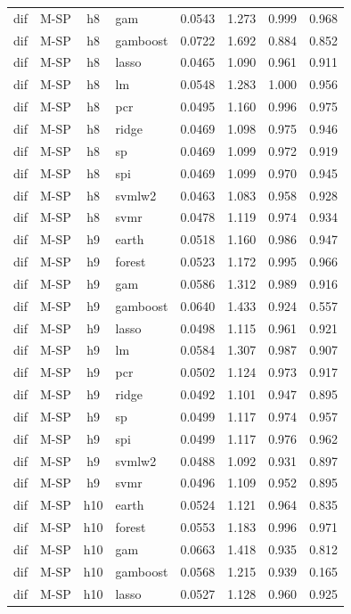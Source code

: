 \begin{ThreePartTable}
\begin{longtable}[t]{llclcccc}
dif & M-SP & h8 & gam & 0.0543 & 1.273 & 0.999 & 0.968\\
dif & M-SP & h8 & gamboost & 0.0722 & 1.692 & 0.884 & 0.852\\
dif & M-SP & h8 & lasso & 0.0465 & 1.090 & 0.961 & 0.911\\
dif & M-SP & h8 & lm & 0.0548 & 1.283 & 1.000 & 0.956\\
dif & M-SP & h8 & pcr & 0.0495 & 1.160 & 0.996 & 0.975\\
dif & M-SP & h8 & ridge & 0.0469 & 1.098 & 0.975 & 0.946\\
dif & M-SP & h8 & sp & 0.0469 & 1.099 & 0.972 & 0.919\\
dif & M-SP & h8 & spi & 0.0469 & 1.099 & 0.970 & 0.945\\
dif & M-SP & h8 & svmlw2 & 0.0463 & 1.083 & 0.958 & 0.928\\
dif & M-SP & h8 & svmr & 0.0478 & 1.119 & 0.974 & 0.934\\
\addlinespace
dif & M-SP & h9 & earth & 0.0518 & 1.160 & 0.986 & 0.947\\
dif & M-SP & h9 & forest & 0.0523 & 1.172 & 0.995 & 0.966\\
dif & M-SP & h9 & gam & 0.0586 & 1.312 & 0.989 & 0.916\\
dif & M-SP & h9 & gamboost & 0.0640 & 1.433 & 0.924 & 0.557\\
dif & M-SP & h9 & lasso & 0.0498 & 1.115 & 0.961 & 0.921\\
dif & M-SP & h9 & lm & 0.0584 & 1.307 & 0.987 & 0.907\\
dif & M-SP & h9 & pcr & 0.0502 & 1.124 & 0.973 & 0.917\\
dif & M-SP & h9 & ridge & 0.0492 & 1.101 & 0.947 & 0.895\\
dif & M-SP & h9 & sp & 0.0499 & 1.117 & 0.974 & 0.957\\
dif & M-SP & h9 & spi & 0.0499 & 1.117 & 0.976 & 0.962\\
dif & M-SP & h9 & svmlw2 & 0.0488 & 1.092 & 0.931 & 0.897\\
dif & M-SP & h9 & svmr & 0.0496 & 1.109 & 0.952 & 0.895\\
\addlinespace
dif & M-SP & h10 & earth & 0.0524 & 1.121 & 0.964 & 0.835\\
dif & M-SP & h10 & forest & 0.0553 & 1.183 & 0.996 & 0.971\\
dif & M-SP & h10 & gam & 0.0663 & 1.418 & 0.935 & 0.812\\
dif & M-SP & h10 & gamboost & 0.0568 & 1.215 & 0.939 & 0.165\\
dif & M-SP & h10 & lasso & 0.0527 & 1.128 & 0.960 & 0.925\\

\end{longtable}
\end{ThreePartTable}
